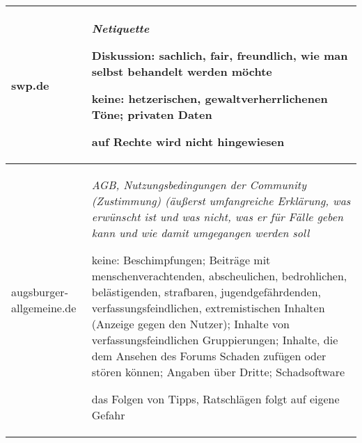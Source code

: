 \begin{longtable}{p{28mm}p{110mm}}
swp.de & \emph{Netiquette}

  Diskussion: sachlich, fair, freundlich, wie man selbst behandelt werden möchte

  keine: hetzerischen, gewaltverherrlichenen Töne; privaten Daten

  auf Rechte wird nicht hingewiesen\tabularnewline\midrule


augsburger-allgemeine.de &
  \emph{AGB, Nutzungsbedingungen der Community (Zustimmung) (äußerst
  umfangreiche Erklärung, was erwünscht ist und was nicht, was er für Fälle
  geben kann und wie damit umgegangen werden soll}

  keine: Beschimpfungen; Beiträge mit menschenverachtenden, abscheulichen,
  bedrohlichen, belästigenden, strafbaren, jugendgefährdenden,
  verfassungsfeindlichen, extremistischen Inhalten (Anzeige gegen den Nutzer);
  Inhalte von verfassungsfeindlichen Gruppierungen; Inhalte, die dem Ansehen des
  Forums Schaden zufügen oder stören können;  Angaben über Dritte; Schadsoftware

  das Folgen von Tipps, Ratschlägen folgt auf eigene Gefahr

\end{longtable}
\endgroup

